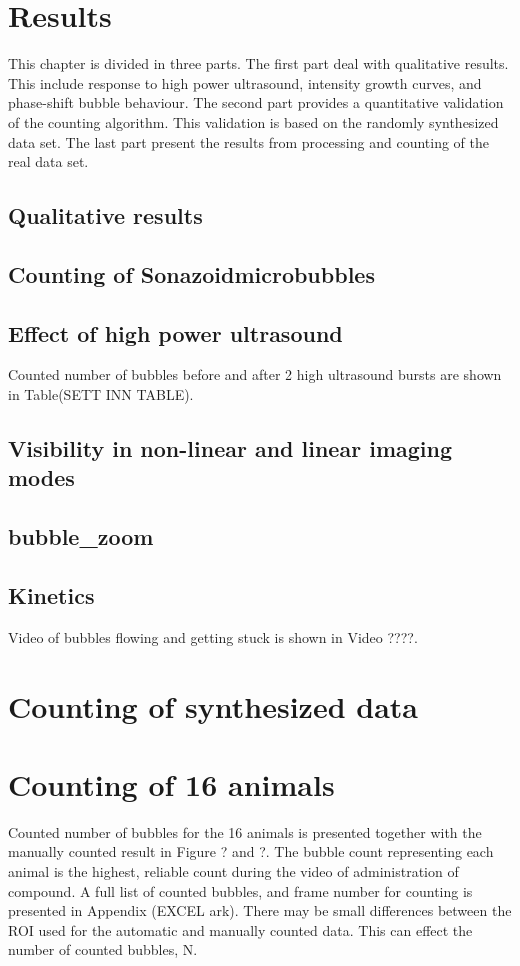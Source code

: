 \section{Results}
This chapter is divided in three parts. The first part deal with qualitative results. This include response to high power ultrasound, intensity growth curves, and phase-shift bubble behaviour. The second part provides a quantitative validation of the counting algorithm. This validation is based on the randomly synthesized data set. The last part present the results from processing and counting of the real data set. 
 
\subsection{Qualitative results}
\subsection{Counting of Sonazoid\texttrademark microbubbles}
\subsection{Effect of high power ultrasound}
Counted number of bubbles before and after 2 high ultrasound bursts are shown in Table(SETT INN TABLE).
 

\subsection{Visibility in non-linear and linear imaging modes}
\subsection{bubble_zoom}
\subsection{Kinetics}
Video of bubbles flowing and getting stuck is shown in Video ????.
\section{Counting of synthesized data}


\section{Counting of 16 animals}
Counted number of bubbles for the 16 animals is presented together with the manually counted result in Figure ? and ?. The bubble count representing each animal is the highest, reliable count during the video of administration of compound. A full list of counted bubbles, and frame number for counting is presented in Appendix (EXCEL ark).
There may be small differences between the ROI used for the automatic and manually counted data. This can effect the number of counted bubbles, N.

